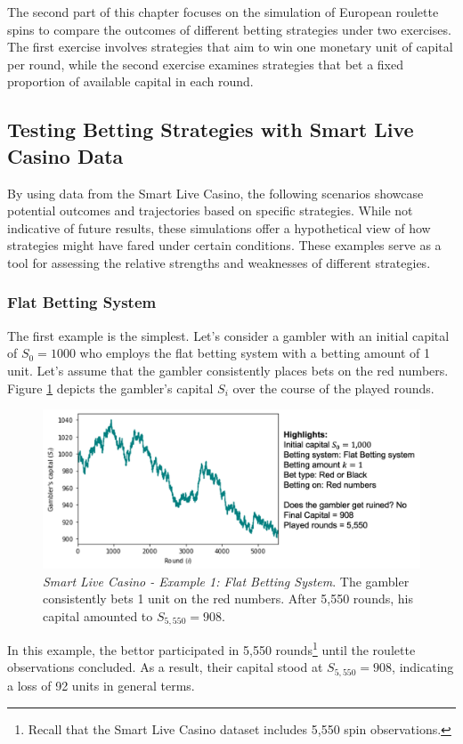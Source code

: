 \documentclass[11pt,twoside]{article}
\numberwithin{Theorem}{section}
\numberwithin{Definition}{section}
\numberwithin{Lemma}{section}
\numberwithin{Algorithm}{section}
\numberwithin{equation}{section}
\begin{document}
The second part of this chapter focuses on the simulation of European roulette spins to compare the outcomes of different betting strategies under two exercises. The first exercise involves strategies that aim to win one monetary unit of capital per round, while the second exercise examines strategies that bet a fixed proportion of available capital in each round.
\subsection{Testing Betting Strategies with Smart Live Casino Data}
By using data from the Smart Live Casino, the following scenarios showcase potential outcomes and trajectories based on specific strategies. While not indicative of future results, these simulations offer a hypothetical view of how strategies might have fared under certain conditions. These examples serve as a tool for assessing the relative strengths and weaknesses of different strategies.
\subsubsection{Flat Betting System}
The first example is the simplest. Let's consider a gambler with an initial capital of $S_{0} = 1000$ who employs the flat betting system with a betting amount of 1 unit. Let's assume that the gambler consistently places bets on the red numbers. Figure \ref{sim_live_01} depicts the gambler's capital $S_{i}$ over the course of the played rounds.

\begin{figure}[H]
    \centering
    \includegraphics[width=11 cm]{sim_01.png}
    \caption[Smart Live Casino - Example 1: Flat Betting System]{\textit{Smart Live Casino - Example 1: Flat Betting System}. The gambler consistently bets 1 unit on the red numbers. After 5,550 rounds, his capital amounted to $S_{5,550} = 908$.}\label{sim_live_01}
\end{figure}

In this example, the bettor participated in 5,550 rounds\footnote{Recall that the Smart Live Casino dataset includes 5,550 spin observations.} until the roulette observations concluded. As a result, their capital stood at $S_{5,550} = 908$, indicating a loss of 92 units in general terms.
\end{document}

